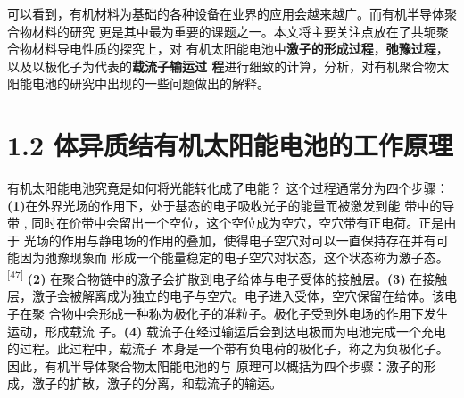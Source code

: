\documentclass[12pt,]{report}
\begin{document}
可以看到，有机材料为基础的各种设备在业界的应用会越来越广。而有机半导体聚合物材料的研究
更是其中最为重要的课题之一。本文将主要关注点放在了共轭聚合物材料导电性质的探究上，对
有机太阳能电池中\textbf{激子的形成过程}，\textbf{弛豫过程}，以及以极化子为代表的\textbf{载流子输运过
程}进行细致的计算，分析，对有机聚合物太阳能电池的研究中出现的一些问题做出的解释。

\section{1.2
体异质结有机太阳能电池的工作原理}\label{ux4f53ux5f02ux8d28ux7ed3ux6709ux673aux592aux9633ux80fdux7535ux6c60ux7684ux5de5ux4f5cux539fux7406}

有机太阳能电池究竟是如何将光能转化成了电能？ 这个过程通常分为四个步骤：
\textbf{(1)}在外界光场的作用下，处于基态的电子吸收光子的能量而被激发到能
带中的导带 ,
同时在价带中会留出一个空位，这个空位成为空穴，空穴带有正电荷。正是由于
光场的作用与静电场的作用的叠加，使得电子空穴对可以一直保持存在并有可能因为弛豫现象而
形成一个能量稳定的电子空穴对状态，这个状态称为激子态。\textsuperscript{{[}47{]}}
\textbf{(2)}
在聚合物链中的激子会扩散到电子给体与电子受体的接触层。\textbf{(3)}
在接触层，激子会被解离成为独立的电子与空穴。电子进入受体，空穴保留在给体。该电子在聚
合物中会形成一种称为极化子的准粒子。极化子受到外电场的作用下发生运动，形成载流
子。\textbf{(4)}
载流子在经过输运后会到达电极而为电池完成一个充电的过程。此过程中，载流子
本身是一个带有负电荷的极化子，称之为负极化子。
因此，有机半导体聚合物太阳能电池的与
原理可以概括为四个步骤：激子的形成，激子的扩散，激子的分离，和载流子的输运。
\end{document}
